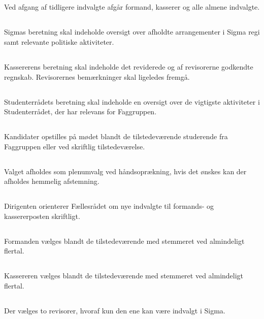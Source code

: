 \documentclass[danish,a4paper,twocolumn]{article}
\begin{document}
\subsection{} Ved afgang af tidligere indvalgte afgår formand, kasserer og alle almene indvalgte.
\subsection{}Sigmas beretning skal indeholde oversigt over afholdte arrangementer i Sigma regi samt relevante politiske aktiviteter.
\subsection{}Kassererens beretning skal indeholde det reviderede og af revisorerne godkendte regnskab. Revisorernes bemærkninger skal ligeledes fremgå.
\subsection{}Studenterrådets beretning skal indeholde en oversigt over de vigtigste aktiviteter i Studenterrådet, der har relevans for Faggruppen.
\subsection{}Kandidater opstilles på mødet blandt de tilstedeværende
studerende fra Faggruppen eller ved skriftlig tilstedeværelse.
\subsection{}Valget afholdes som plenumvalg ved håndsoprækning, hvis det ønskes kan der afholdes hemmelig afstemning.
\subsection{}Dirigenten orienterer Fællesrådet om nye indvalgte til formands- og kassererposten skriftligt.
\subsection{}Formanden vælges blandt de tilstedeværende med stemmeret ved almindeligt flertal. 
\subsection{}Kassereren vælges blandt de tilstedeværende med stemmeret ved almindeligt flertal.
\subsection{}Der vælges to revisorer, hvoraf kun den ene kan være indvalgt i Sigma.
\end{document}
